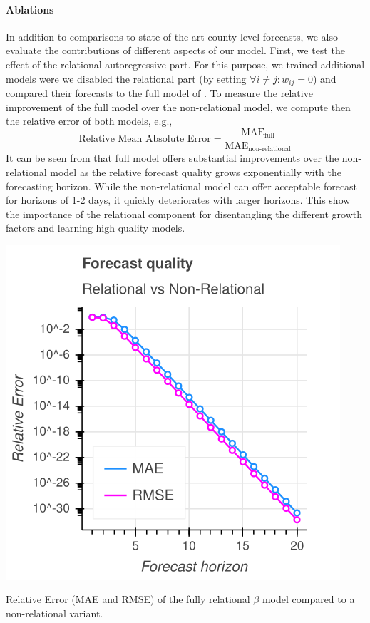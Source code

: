 \documentclass[nobib]{tufte-handout}
\newcommand{\bAR}{\ensuremath{\beta}\text{-AR}\xspace}
\begin{document}
\paragraph{Ablations} In addition to comparisons to state-of-the-art
county-level forecasts, we also evaluate the contributions of different aspects
of our model. First, we test the effect of the relational autoregressive part.
For this purpose, we trained additional models were we disabled the relational
part (by setting \(\forall i \neq j: w_{ij} = 0\)) and compared their forecasts to
the full model of . To measure the relative improvement of the
full model over the non-relational model, we compute then the relative error of
both models, e.g.,
\begin{equation*}
    \text{Relative Mean Absolute Error} = \frac{\text{MAE}_{\text{full}}}{\text{MAE}_\text{non-relational}}
\end{equation*}
It can be seen from  that full model offers substantial
improvements over the non-relational model as the relative forecast quality
grows exponentially with the forecasting horizon. While the non-relational model
can offer acceptable forecast for horizons of 1-2 days, it quickly deteriorates
with larger horizons. This show the importance of the relational component for
disentangling the different growth factors and learning high quality models.

\begin{marginfigure}[-30em]

\includegraphics[width=\columnwidth]{img/quality_ratio.png}
\caption{\label{fig:quality-ratio}Relative Error (MAE and RMSE) of the fully relational \bAR model compared to a non-relational variant.}
\end{marginfigure}
\end{document}
